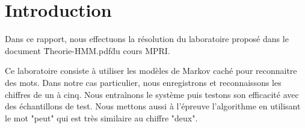 
\chapter{Introduction} %

\label{Chapitre 1} %


Dans ce rapport, nous effectuons la résolution du laboratoire proposé dans le document \"Theorie-HMM.pdf\" du cours MPRI.

Ce laboratoire consiste à utiliser les modèles de Markov caché pour reconnaitre des mots. Dans notre cas particulier, nous enregistrons et reconnaissons les chiffres de un à cinq.
Nous entraînons le système puis testons son efficacité avec des échantillons de test. Nous mettons aussi à l'épreuve l'algorithme en utilisant le mot "peut" qui est très similaire au chiffre "deux".

























